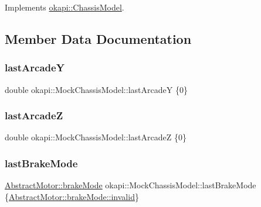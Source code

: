 Implements \mbox{\hyperlink{classokapi_1_1ChassisModel_a185a667048f84c3a0fced6882c5f7980}{okapi\+::\+Chassis\+Model}}.



\subsection{Member Data Documentation}
\mbox{\label{classokapi_1_1MockChassisModel_aea7d0aa26d03376af5e67c92f458bd86}} 
\subsubsection{\texorpdfstring{lastArcadeY}{lastArcadeY}}
{\footnotesize\ttfamily double okapi\+::\+Mock\+Chassis\+Model\+::last\+ArcadeY \{0\}\hspace{0.3cm}{\ttfamily [mutable]}}

\mbox{\label{classokapi_1_1MockChassisModel_a5d92d43fb202fbb3a1b47ea4095d10d9}} 
\subsubsection{\texorpdfstring{lastArcadeZ}{lastArcadeZ}}
{\footnotesize\ttfamily double okapi\+::\+Mock\+Chassis\+Model\+::last\+ArcadeZ \{0\}\hspace{0.3cm}{\ttfamily [mutable]}}

\mbox{\label{classokapi_1_1MockChassisModel_a70ac111f1eab1281c86f3c8f865a835c}} 
\subsubsection{\texorpdfstring{lastBrakeMode}{lastBrakeMode}}
{\footnotesize\ttfamily \mbox{\hyperlink{classokapi_1_1AbstractMotor_a132e0485dbb59a60c3f934338d8fa601}{Abstract\+Motor\+::brake\+Mode}} okapi\+::\+Mock\+Chassis\+Model\+::last\+Brake\+Mode \{\mbox{\hyperlink{classokapi_1_1AbstractMotor_a132e0485dbb59a60c3f934338d8fa601afedb2d84cafe20862cb4399751a8a7e3}{Abstract\+Motor\+::brake\+Mode\+::invalid}}\}\hspace{0.3cm}{\ttfamily [mutable]}}

